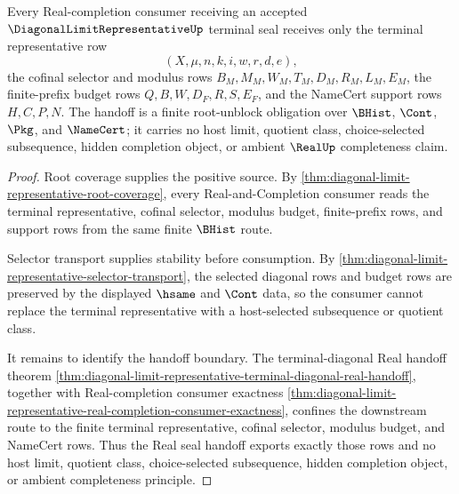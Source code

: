 \begin{theorem}\label{thm:diagonal-limit-representative-real-seal-handoff}
Every Real-completion consumer receiving an accepted $\DiagonalLimitRepresentativeUp$ terminal seal receives only the terminal representative row
$$
(X,\mu,n,k,i,w,r,d,e),
$$
the cofinal selector and modulus rows $B_M,M_M,W_M,T_M,D_M,R_M,L_M,E_M$, the finite-prefix budget rows $Q,B,W,D_F,R,S,E_F$, and the NameCert support rows $H,C,P,N$. The handoff is a finite root-unblock obligation over $\BHist$, $\Cont$, $\Pkg$, and $\NameCert$; it carries no host limit, quotient class, choice-selected subsequence, hidden completion object, or ambient $\RealUp$ completeness claim.
\end{theorem}
\begin{proof}
Root coverage supplies the positive source. By \autoref{thm:diagonal-limit-representative-root-coverage}, every Real-and-Completion consumer reads the terminal representative, cofinal selector, modulus budget, finite-prefix rows, and support rows from the same finite $\BHist$ route.

Selector transport supplies stability before consumption. By \autoref{thm:diagonal-limit-representative-selector-transport}, the selected diagonal rows and budget rows are preserved by the displayed $\hsame$ and $\Cont$ data, so the consumer cannot replace the terminal representative with a host-selected subsequence or quotient class.

It remains to identify the handoff boundary. The terminal-diagonal Real handoff theorem \autoref{thm:diagonal-limit-representative-terminal-diagonal-real-handoff}, together with Real-completion consumer exactness \autoref{thm:diagonal-limit-representative-real-completion-consumer-exactness}, confines the downstream route to the finite terminal representative, cofinal selector, modulus budget, and NameCert rows. Thus the Real seal handoff exports exactly those rows and no host limit, quotient class, choice-selected subsequence, hidden completion object, or ambient completeness principle.
\end{proof}
